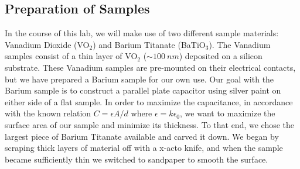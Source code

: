\documentclass[%
 reprint,
 amsmath,amssymb,
 aps,
 pra,
]{revtex4-1}
\begin{document}
\subsection{Preparation of Samples}

In the course of this lab, we will make use of two different sample materials: Vanadium Dioxide (VO$_2$) and Barium Titanate (BaTiO$_3$). The Vanadium samples consist of a thin layer of VO$_2$ ($\sim 100~nm$) deposited on a silicon substrate. These Vanadium samples are pre-mounted on their electrical contacts, but we have prepared a Barium sample for our own use. Our goal with the Barium sample is to construct a parallel plate capacitor using silver paint on either side of a flat sample. In order to maximize the capacitance, in accordance with the known relation $C = \epsilon A/d$ where $\epsilon = k \epsilon_0$, we want to maximize the surface area of our sample and minimize its thickness. To that end, we chose the largest piece of Barium Titanate available and carved it down. We began by scraping thick layers of material off with a x-acto knife, and when the sample became sufficiently thin we switched to sandpaper to smooth the surface.
\end{document}
